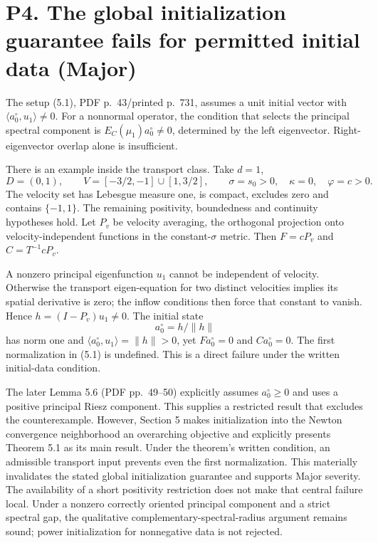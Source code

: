 \documentclass[10pt]{article}
\begin{document}
\section*{P4. The global initialization guarantee fails for permitted initial data (Major)}
The setup (5.1), PDF p. 43/printed p. 731, assumes a unit initial vector with \(\langle a_0^\circ,u_1\rangle\ne0\). For a nonnormal operator, the condition that selects the principal spectral component is \(E_C(\mu_1)a_0^\circ\ne0\), determined by the left eigenvector. Right-eigenvector overlap alone is insufficient.\par
There is an example inside the transport class. Take \(d=1\), \[D=(0,1),\qquad
V=[-3/2,-1]\cup[1,3/2],\qquad
\sigma=s_0>0,\quad \kappa=0,\quad \varphi=c>0.\] The velocity set has Lebesgue measure one, is compact, excludes zero and contains \(\{-1,1\}\). The remaining positivity, boundedness and continuity hypotheses hold. Let \(P_v\) be velocity averaging, the orthogonal projection onto velocity-independent functions in the constant-\(\sigma\) metric. Then \(F=cP_v\) and \(C=T^{-1}cP_v\).\par
A nonzero principal eigenfunction \(u_1\) cannot be independent of velocity. Otherwise the transport eigen-equation for two distinct velocities implies its spatial derivative is zero; the inflow conditions then force that constant to vanish. Hence \(h=(I-P_v)u_1\ne0\). The initial state \[a_0^\circ=h/\|h\|\] has norm one and \(\langle a_0^\circ,u_1\rangle=\|h\|>0\), yet \(Fa_0^\circ=0\) and \(Ca_0^\circ=0\). The first normalization in (5.1) is undefined. This is a direct failure under the written initial-data condition.\par
The later Lemma 5.6 (PDF pp. 49–50) explicitly assumes \(a_0^\circ\ge0\) and uses a positive principal Riesz component. This supplies a restricted result that excludes the counterexample. However, Section 5 makes initialization into the Newton convergence neighborhood an overarching objective and explicitly presents Theorem 5.1 as its main result. Under the theorem’s written condition, an admissible transport input prevents even the first normalization. This materially invalidates the stated global initialization guarantee and supports Major severity. The availability of a short positivity restriction does not make that central failure local. Under a nonzero correctly oriented principal component and a strict spectral gap, the qualitative complementary-spectral-radius argument remains sound; power initialization for nonnegative data is not rejected.\par
\end{document}
